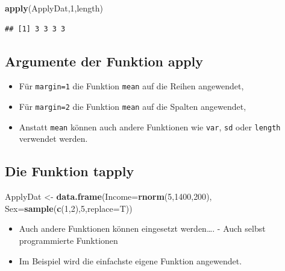 \documentclass[]{article}
\newenvironment{Shaded}{\begin{snugshade}}{\end{snugshade}}
\newcommand{\KeywordTok}[1]{\textcolor[rgb]{0.13,0.29,0.53}{\textbf{{#1}}}}
\newcommand{\DataTypeTok}[1]{\textcolor[rgb]{0.13,0.29,0.53}{{#1}}}
\newcommand{\DecValTok}[1]{\textcolor[rgb]{0.00,0.00,0.81}{{#1}}}
\newcommand{\StringTok}[1]{\textcolor[rgb]{0.31,0.60,0.02}{{#1}}}
\newcommand{\NormalTok}[1]{{#1}}
\providecommand{\tightlist}{%
  \setlength{\itemsep}{0pt}\setlength{\parskip}{0pt}}
\begin{document}
\begin{Shaded}
\begin{Highlighting}[]
\KeywordTok{apply}\NormalTok{(ApplyDat,}\DecValTok{1}\NormalTok{,length)}
\end{Highlighting}
\end{Shaded}

\begin{verbatim}
## [1] 3 3 3 3
\end{verbatim}

\subsection{Argumente der Funktion
apply}\label{argumente-der-funktion-apply}

\begin{itemize}
\item
  Für \texttt{margin=1} die Funktion \texttt{mean} auf die Reihen
  angewendet,
\item
  Für \texttt{margin=2} die Funktion \texttt{mean} auf die Spalten
  angewendet,
\item
  Anstatt \texttt{mean} können auch andere Funktionen wie \texttt{var},
  \texttt{sd} oder \texttt{length} verwendet werden.
\end{itemize}

\subsection{Die Funktion tapply}\label{die-funktion-tapply}

\begin{Shaded}
\begin{Highlighting}[]
\NormalTok{ApplyDat <-}\StringTok{ }\KeywordTok{data.frame}\NormalTok{(}\DataTypeTok{Income=}\KeywordTok{rnorm}\NormalTok{(}\DecValTok{5}\NormalTok{,}\DecValTok{1400}\NormalTok{,}\DecValTok{200}\NormalTok{),}
                       \DataTypeTok{Sex=}\KeywordTok{sample}\NormalTok{(}\KeywordTok{c}\NormalTok{(}\DecValTok{1}\NormalTok{,}\DecValTok{2}\NormalTok{),}\DecValTok{5}\NormalTok{,}\DataTypeTok{replace=}\NormalTok{T))}
\end{Highlighting}
\end{Shaded}

\begin{itemize}
\tightlist
\item
  Auch andere Funktionen können eingesetzt werden\ldots{}. - Auch selbst
  programmierte Funktionen
\item
  Im Beispiel wird die einfachste eigene Funktion angewendet.
\end{itemize}
\end{document}
